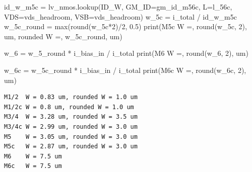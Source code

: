 \documentclass[
  a4paper,
  DIV=11,
  numbers=noendperiod]{scrartcl}
\newenvironment{Shaded}{\begin{snugshade}}{\end{snugshade}}
\newcommand{\BuiltInTok}[1]{\textcolor[rgb]{0.00,0.23,0.31}{#1}}
\newcommand{\DecValTok}[1]{\textcolor[rgb]{0.68,0.00,0.00}{#1}}
\newcommand{\FloatTok}[1]{\textcolor[rgb]{0.68,0.00,0.00}{#1}}
\newcommand{\NormalTok}[1]{\textcolor[rgb]{0.00,0.23,0.31}{#1}}
\newcommand{\OperatorTok}[1]{\textcolor[rgb]{0.37,0.37,0.37}{#1}}
\newcommand{\StringTok}[1]{\textcolor[rgb]{0.13,0.47,0.30}{#1}}
\begin{document}
\begin{tcolorbox}
\begin{Shaded}
\begin{Highlighting}[]
\NormalTok{id\_w\_m5c }\OperatorTok{=}\NormalTok{ lv\_nmos.lookup(}\StringTok{\textquotesingle{}ID\_W\textquotesingle{}}\NormalTok{, GM\_ID}\OperatorTok{=}\NormalTok{gm\_id\_m56c, L}\OperatorTok{=}\NormalTok{l\_56c, VDS}\OperatorTok{=}\NormalTok{vds\_headroom, VSB}\OperatorTok{=}\NormalTok{vds\_headroom)}
\NormalTok{w\_5c }\OperatorTok{=}\NormalTok{ i\_total }\OperatorTok{/}\NormalTok{ id\_w\_m5c}
\NormalTok{w\_5c\_round }\OperatorTok{=} \BuiltInTok{max}\NormalTok{(}\BuiltInTok{round}\NormalTok{(w\_5c}\OperatorTok{*}\DecValTok{2}\NormalTok{)}\OperatorTok{/}\DecValTok{2}\NormalTok{, }\FloatTok{0.5}\NormalTok{)}
\BuiltInTok{print}\NormalTok{(}\StringTok{\textquotesingle{}M5c   W =\textquotesingle{}}\NormalTok{, }\BuiltInTok{round}\NormalTok{(w\_5c, }\DecValTok{2}\NormalTok{), }\StringTok{\textquotesingle{}um, rounded W =\textquotesingle{}}\NormalTok{, w\_5c\_round, }\StringTok{\textquotesingle{}um\textquotesingle{}}\NormalTok{)}

\NormalTok{w\_6 }\OperatorTok{=}\NormalTok{ w\_5\_round }\OperatorTok{*}\NormalTok{ i\_bias\_in }\OperatorTok{/}\NormalTok{ i\_total}
\BuiltInTok{print}\NormalTok{(}\StringTok{\textquotesingle{}M6    W =\textquotesingle{}}\NormalTok{, }\BuiltInTok{round}\NormalTok{(w\_6, }\DecValTok{2}\NormalTok{), }\StringTok{\textquotesingle{}um\textquotesingle{}}\NormalTok{)}

\NormalTok{w\_6c }\OperatorTok{=}\NormalTok{ w\_5c\_round }\OperatorTok{*}\NormalTok{ i\_bias\_in }\OperatorTok{/}\NormalTok{ i\_total}
\BuiltInTok{print}\NormalTok{(}\StringTok{\textquotesingle{}M6c   W =\textquotesingle{}}\NormalTok{, }\BuiltInTok{round}\NormalTok{(w\_6c, }\DecValTok{2}\NormalTok{), }\StringTok{\textquotesingle{}um\textquotesingle{}}\NormalTok{)}
\end{Highlighting}
\end{Shaded}

\begin{verbatim}
M1/2  W = 0.83 um, rounded W = 1.0 um
M1/2c W = 0.8 um, rounded W = 1.0 um
M3/4  W = 3.28 um, rounded W = 3.5 um
M3/4c W = 2.99 um, rounded W = 3.0 um
M5    W = 3.05 um, rounded W = 3.0 um
M5c   W = 2.87 um, rounded W = 3.0 um
M6    W = 7.5 um
M6c   W = 7.5 um
\end{verbatim}


\end{tcolorbox}
\end{document}
